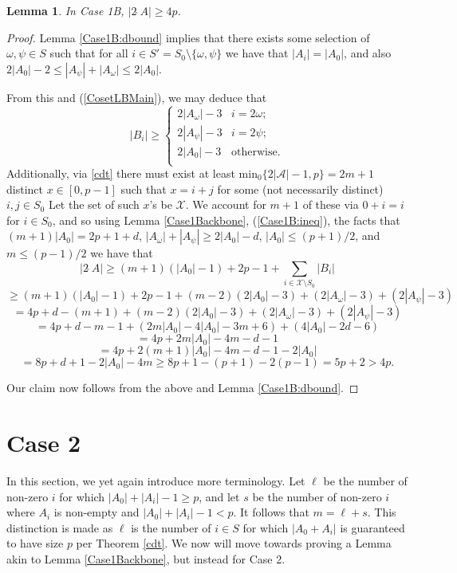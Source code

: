 \documentclass[a4paper, 12pt]{article}\usepackage[english]{babel}
\newtheorem{lem}[thm]{Lemma}
\newcommand{\minz}{\mathrm{min}_0}
\newcommand{\A}{\mathcal{A}}
\newcommand{\<}{\langle}
\begin{document}
\begin{lem}
    In Case 1B, $|2\hat{\;}A|\geq 4p$.
\end{lem}
\begin{proof}
    Lemma \ref{Case1B:dbound} implies that there exists some selection of $\omega,\psi\in S$ such that for all $i\in S'=S_0\setminus\{\omega,\psi\}$ we have that $|A_i|=|A_0|$, and also $2|A_0|-2\leq |A_\psi|+|A_\omega|\leq 2|A_0|$.

    From this and (\ref{CosetLBMain}), we may deduce that \begin{equation}
    \label{Case1B:ineq}
        |B_i|\geq \begin{cases}
        2|A_\omega|-3 & i=2\omega;\\
        2|A_\psi|-3 & i=2\psi;\\
        2|A_0|-3 & \text{otherwise}.\\
    \end{cases}
    \end{equation}
Additionally, via \ref{cdt} there must exist at least $\minz\{2|\A|-1,p\}=2m+1$ distinct $x\in[0,p-1]$ such that $x=i+j$ for some (not necessarily distinct) $i,j\in S_0$ Let the set of such $x$'s be $\mathcal{X}$. We account for $m+1$ of these via $0+i=i$ for $i\in S_0$, and so using Lemma \ref{Case1Backbone}, (\ref{Case1B:ineq}), the facts that $(m+1)|A_0|=2p+1+d$, $|A_\omega|+|A_\psi|\geq 2|A_0|-d$, $|A_0|\leq (p+1)/2$, and $m\leq (p-1)/2$ we have that \[|2\hat{\;}A|\geq (m+1)(|A_0|-1)+2p-1+\sum_{i\in \mathcal{X}\setminus S_0}|B_i|\]
\[\geq (m+1)(|A_0|-1)+2p-1+(m-2)(2|A_0|-3)+(2|A_\omega|-3)+(2|A_\psi|-3)\]
\[=4p+d-(m+1)+(m-2)(2|A_0|-3)+(2|A_\omega|-3)+(2|A_\psi|-3)\]
\[=4p+d-m-1+(2m|A_0|-4|A_0|-3m+6)+(4|A_0|-2d-6)\]
\[=4p+2m|A_0|-4m-d-1\]\[=4p+2(m+1)|A_0|-4m-d-1-2|A_0|\]
\[=8p+d+1-2|A_0|-4m\geq 8p+1-(p+1)-2(p-1)=5p+2>4p.\]

Our claim now follows from the above and Lemma \ref{Case1B:dbound}.  
\end{proof}


\section{Case 2}
\label{Section2}

In this section, we yet again introduce more terminology. Let $\ell$
be the number of non-zero $i$ for which $|A_0|+|A_i|-1\geq p$, and let $s$ be the number of non-zero $i$ where $A_i$ is non-empty and $|A_0|+|A_i|-1< p$. It follows that $m=\ell+s$. This distinction is made as $\ell$ is the number of $i\in S$ for which $|A_0+A_i|$ is guaranteed to have size $p$ per Theorem \ref{cdt}.
We now will move towards proving a Lemma akin to Lemma \ref{Case1Backbone}, but instead for Case 2.
\end{document}
